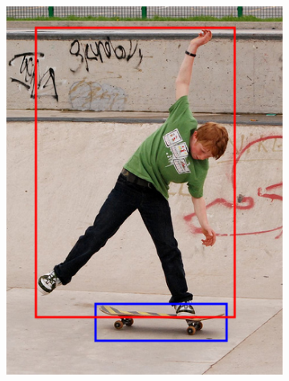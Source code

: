\begin{figure}[H]
\begin{subfigure}[b]{0.2\textwidth}
        \includegraphics[width=\textwidth]{Figs/Problem/objfieldsbbox.png}
        \caption{}\label{fig:objbb}
    \end{subfigure}
    \begin{subfigure}[b]{0.2\textwidth}
        \center

\end{subfigure}
\end{figure}
